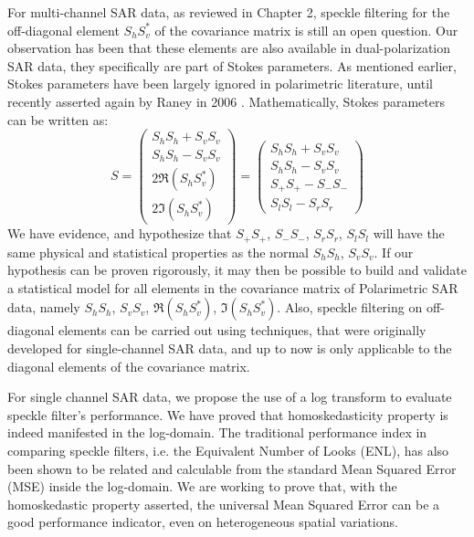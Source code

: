 For multi-channel SAR data, as reviewed in Chapter 2, speckle filtering for the off-diagonal element $S_hS_v^*$ of the covariance matrix is still an open question.
Our observation has been that these elements are also available in dual-polarization SAR data, they specifically are part of Stokes parameters.
As mentioned earlier, Stokes parameters have been largely ignored in polarimetric literature, until recently asserted again by Raney in 2006 \cite{Raney_2006_IGARSS}.
Mathematically, Stokes parameters can be written as:
\begin{equation}
S = 
\left(
	\begin{array} {c}
		S_hS_h + S_vS_v \\
		S_hS_h - S_vS_v \\
		2 \Re{(S_hS_v^*)} \\
		2 \Im{(S_hS_v^*)}
	\end{array}
\right)
= 
\left(
	\begin{array} {c}
		S_hS_h + S_vS_v \\
		S_hS_h - S_vS_v \\
		S_+S_+ - S_-S_- \\
		S_lS_l - S_rS_r
	\end{array}
\right)
\end{equation}
We have evidence, and hypothesize that $S_+S_+$, $S_-S_-$, $S_rS_r$, $S_lS_l$ will have the same physical and statistical properties as the normal $S_hS_h$, $S_vS_v$.
If our hypothesis can be proven rigorously, it may then be possible to build and validate a statistical model for all elements in the covariance matrix of Polarimetric SAR data, namely $S_hS_h$, $S_vS_v$, $\Re{( S_hS_v^*)}$, $\Im{( S_hS_v^* )}$.
Also, speckle filtering on off-diagonal elements can be carried out using techniques, that were originally developed for single-channel SAR data, and up to now is only applicable to the diagonal elements of the covariance matrix.

For single channel SAR data, we propose the use of a log transform to evaluate speckle filter's performance. 
We have proved that homoskedasticity property is indeed manifested in the log-domain.
The traditional performance index in comparing speckle filters, i.e. the Equivalent Number of Looks (ENL), has also been shown to be related and calculable from the standard Mean Squared Error (MSE) inside the log-domain.
We are working to prove that, with the homoskedastic property asserted, the universal Mean Squared Error can be a good performance indicator, even on heterogeneous spatial variations.

